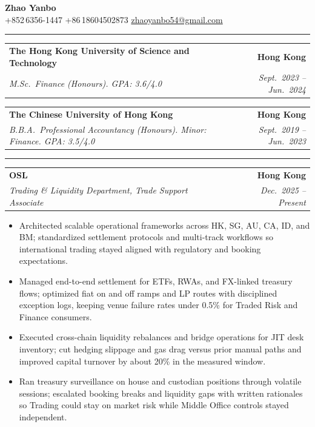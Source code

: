 \documentclass[9pt,a4paper]{extarticle}
\makeatletter
\newcommand{\ressection}[1]{%
  \vspace{0.8em}%
  \noindent{\large\scshape\bfseries #1}\par\nobreak
  \vspace{-\parskip}%
  \vspace{-\parskip}%
  \vspace{-\parskip}%
  \vspace{-\parskip}%
  \noindent\rule{\linewidth}{0.1pt}\par\nobreak
  \vspace{-\parskip}%
}
\newcommand{\resumeSubheading}[4]{%
  \vspace{0.6em}%
  \begin{tabular*}{\textwidth}{l@{\extracolsep{\fill}}r}
    \textbf{#1} & \textbf{#2} \\
    \textit{\small #3} & \textit{\small #4} \\
  \end{tabular*}\vspace{0.32em}}
\makeatother
\begin{document}
\begin{center}
  {\LARGE\bfseries Zhao Yanbo}\\[0.35em]
  \small
  +852\,6356-1447 \;\textbar\;
  +86\,18604502873 \;\textbar\;
  \href{mailto:zhaoyanbo54@gmail.com}{zhaoyanbo54@gmail.com}
\end{center}
\vspace{-0.2em}

\ressection{Education}

\resumeSubheading{The Hong Kong University of Science and Technology}{Hong Kong}{M.Sc.\ Finance (Honours). GPA: 3.6/4.0}{Sept.\ 2023 -- Jun.\ 2024}

\resumeSubheading{The Chinese University of Hong Kong}{Hong Kong}{B.B.A.\ Professional Accountancy (Honours). Minor: Finance. GPA: 3.5/4.0}{Sept.\ 2019 -- Jun.\ 2023}

\ressection{Work Experience}

\resumeSubheading{OSL}{Hong Kong}{Trading \& Liquidity Department, Trade Support Associate}{Dec.\ 2025 -- Present}
\begin{itemize}
  \item Architected scalable operational frameworks across HK, SG, AU, CA, ID, and BM; standardized settlement protocols and multi-track workflows so international trading stayed aligned with regulatory and booking expectations.
  \item Managed end-to-end settlement for ETFs, RWAs, and FX-linked treasury flows; optimized fiat on and off ramps and LP routes with disciplined exception logs, keeping venue failure rates under 0.5\% for Traded Risk and Finance consumers.
  \item Executed cross-chain liquidity rebalances and bridge operations for JIT desk inventory; cut hedging slippage and gas drag versus prior manual paths and improved capital turnover by about 20\% in the measured window.
  \item Ran treasury surveillance on house and custodian positions through volatile sessions; escalated booking breaks and liquidity gaps with written rationales so Trading could stay on market risk while Middle Office controls stayed independent.
\end{itemize}
\end{document}
